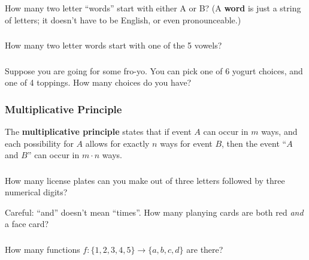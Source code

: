 \documentclass[11pt, compress]{beamer}
\newcommand{\terminology}[1]{\textbf{#1}}
\begin{document}
\begin{frame}
\frametitle{}
\begin{example}[1.1.1]How many two letter ``words''  start with either A or B? (A \terminology{word} is just a string of letters; it doesn't have to be English, or even pronounceable.)
\end{example}
\end{frame}
 
\begin{frame}
\frametitle{}
\begin{example}[1.1.2]How many two letter words start with one of the 5 vowels?
\end{example}
\end{frame}
 
\begin{frame}
\frametitle{}
\begin{example}[1.1.3]Suppose you are going for some fro-yo. You can pick one of 6 yogurt choices, and one of 4 toppings. How many choices do you have?
\end{example}
\end{frame}
 
\begin{frame}
\frametitle{Multiplicative Principle}
 The \terminology{multiplicative principle}  states that if event \(A\) can occur in \(m\) ways, and each possibility for \(A\) allows for exactly \(n\) ways for event \(B\), then the event ``\(A\) and \(B\)'' can occur in \(m \cdot n\) ways.
\end{frame}
 
\begin{frame}
\frametitle{}
\begin{example}[1.1.4]How many license plates can you make out of three letters followed by three numerical digits?
\end{example}
 
\pause \vfill 

Careful: ``and'' doesn't mean ``times''.  How many planying cards are both red \emph{and} a face card?
\end{frame}
 
\begin{frame}
\frametitle{}
\begin{example}How many functions \(f:\{1,2,3,4,5\} \to \{a,b,c,d\}\) are there?
\end{example}
\end{frame}
 
\end{document}
